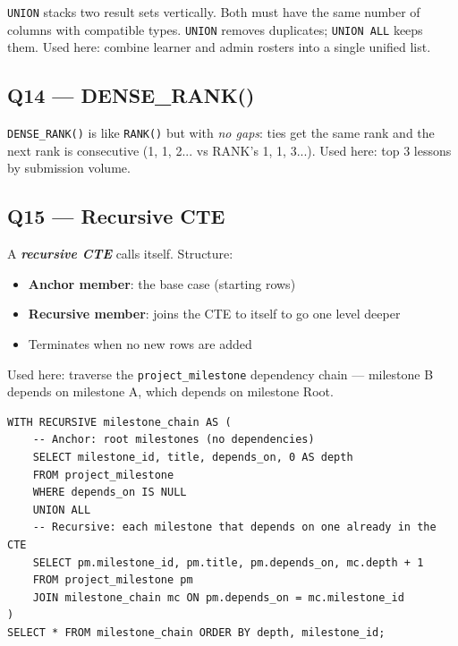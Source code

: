 \documentclass[11pt,a4paper]{article}
\newcommand{\term}[1]{\textbf{\textit{#1}}}
\newcommand{\T}[1]{\texttt{#1}}          %
\begin{document}
\begin{defbox}
\T{UNION} stacks two result sets vertically. Both must have the same number of columns
with compatible types. \T{UNION} removes duplicates; \T{UNION ALL} keeps them.
Used here: combine learner and admin rosters into a single unified list.
\end{defbox}

\subsection{Q14 — DENSE\_RANK()}

\begin{defbox}
\T{DENSE\_RANK()} is like \T{RANK()} but with \textit{no gaps}: ties get the same rank
and the next rank is consecutive (1, 1, 2... vs RANK's 1, 1, 3...).
Used here: top 3 lessons by submission volume.
\end{defbox}

\subsection{Q15 — Recursive CTE}

\begin{defbox}
A \term{recursive CTE} calls itself. Structure:
\begin{itemize}[nosep, leftmargin=1.5em]
  \item \textbf{Anchor member}: the base case (starting rows)
  \item \textbf{Recursive member}: joins the CTE to itself to go one level deeper
  \item Terminates when no new rows are added
\end{itemize}
Used here: traverse the \T{project\_milestone} dependency chain — milestone B depends
on milestone A, which depends on milestone Root.
\end{defbox}

\begin{lstlisting}[style=sql]
WITH RECURSIVE milestone_chain AS (
    -- Anchor: root milestones (no dependencies)
    SELECT milestone_id, title, depends_on, 0 AS depth
    FROM project_milestone
    WHERE depends_on IS NULL
    UNION ALL
    -- Recursive: each milestone that depends on one already in the CTE
    SELECT pm.milestone_id, pm.title, pm.depends_on, mc.depth + 1
    FROM project_milestone pm
    JOIN milestone_chain mc ON pm.depends_on = mc.milestone_id
)
SELECT * FROM milestone_chain ORDER BY depth, milestone_id;
\end{lstlisting}
\end{document}
